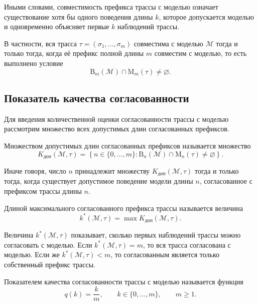 Иными словами, совместимость префикса трассы с моделью означает существование
хотя бы одного поведения длины $k$, которое допускается моделью и одновременно
объясняет первые $k$ наблюдений трассы.

В частности, вся трасса $\tau = (\sigma_1,\dots,\sigma_m)$ совместима с моделью
$\mathcal{M}$ тогда и только тогда, когда её префикс полной длины $m$
совместим с моделью, то есть выполнено условие
\begin{equation}\label{f8b}
\mathrm{B}_m(\mathcal{M}) \cap \mathrm{M}_m(\tau) \neq \varnothing.
\end{equation}

\subsection{Показатель качества согласованности}

Для введения количественной оценки согласованности трассы с моделью рассмотрим
множество всех допустимых длин согласованных префиксов.

\begin{definition}\label{def:K}
Множеством допустимых длин согласованных префиксов называется множество
\begin{equation}\label{f9}
K_{\mathrm{доп}}(\mathcal{M},\tau)
=
\left\{
n \in \{0,\dots,m\}
:
\mathrm{B}_n(\mathcal{M}) \cap \mathrm{M}_n(\tau) \neq \varnothing
\right\}.
\end{equation}
\end{definition}

Иначе говоря, число $n$ принадлежит множеству
$K_{\mathrm{доп}}(\mathcal{M},\tau)$ тогда и только тогда, когда существует
допустимое поведение модели длины $n$, согласованное с префиксом трассы длины
$n$.

\begin{definition}\label{def:k_max}
Длиной максимального согласованного префикса трассы называется величина
\begin{equation}\label{f10}
k^*(\mathcal{M},\tau)
=
\max K_{\mathrm{доп}}(\mathcal{M},\tau).
\end{equation}
\end{definition}

Величина $k^*(\mathcal{M},\tau)$ показывает, сколько первых наблюдений трассы
можно согласовать с моделью. Если $k^*(\mathcal{M},\tau)=m$, то вся трасса
согласована с моделью. Если же $k^*(\mathcal{M},\tau)<m$, то согласованным
является только собственный префикс трассы.

\begin{definition}
Показателем качества согласованности трассы с моделью называется функция
\begin{equation}\label{f11}
q(k)=\frac{k}{m},
\qquad
k \in \{0,\dots,m\},
\qquad
m \ge 1.
\end{equation}
\end{definition}

